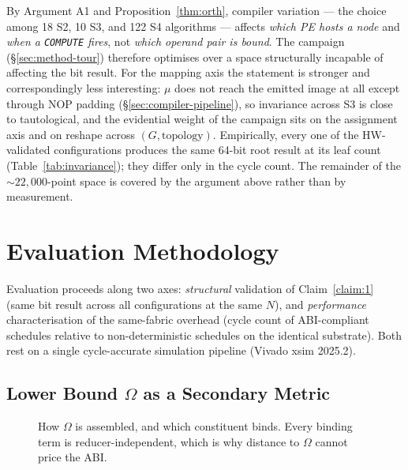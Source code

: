 \documentclass[journal,10pt]{IEEEtran}
\theoremstyle{plain}
\theoremstyle{definition}
\theoremstyle{remark}
\newcommand{\map}{\ensuremath{\mu}}
\begin{document}
By Argument A1 and Proposition~\ref{thm:orth}, compiler variation --- the
choice among 18 S2, 10 S3, and 122 S4 algorithms --- affects
\emph{which PE hosts a node} and \emph{when a \texttt{COMPUTE} fires},
not \emph{which operand pair is bound}. The campaign
(\S\ref{sec:method-tour}) therefore optimises over a space
structurally incapable of affecting the bit result. For the mapping axis
the statement is stronger and correspondingly less interesting: $\map$ does
not reach the emitted image at all except through NOP padding
(\S\ref{sec:compiler-pipeline}), so invariance across S3 is close to
tautological, and the evidential weight of the campaign sits on the
assignment axis and on reshape across $(G,\text{topology})$. Empirically, every one of
the \WallTBs{} HW-validated configurations produces the same 64-bit root
result at its leaf count (Table~\ref{tab:invariance}); they differ only in
the cycle count. The remainder of the ${\sim}22{,}000$-point space is covered
by the argument above rather than by measurement.


\section{Evaluation Methodology}\label{sec:method}

Evaluation proceeds along two axes: \emph{structural} validation of
Claim~\ref{claim:1} (same bit result across all configurations at the same
$N$), and \emph{performance} characterisation of the same-fabric overhead
(cycle count of ABI-compliant schedules relative to non-deterministic
schedules on the identical substrate). Both rest on a single cycle-accurate
simulation pipeline (Vivado xsim 2025.2).

\subsection{Lower Bound $\Omega$ as a Secondary Metric}\label{sec:method-lb}

\begin{figure}[!t]\centering

\caption{How $\Omega$ is assembled, and which constituent binds. Every binding term is reducer-independent, which is why distance to $\Omega$ cannot price the ABI.}\label{fig:omegadecomp}
\end{figure}
\end{document}
